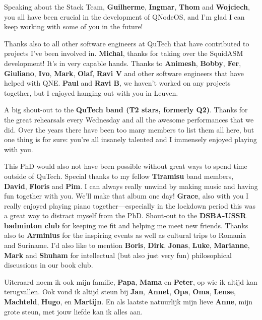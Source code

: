 Speaking about the Stack Team,
\textbf{Guilherme}, \textbf{Ingmar}, \textbf{Thom} and \textbf{Wojciech}, you all have been crucial in the development of QNodeOS, and I'm glad I can keep working with some of you in the future!

Thanks also to all other software engineers at QuTech that have contributed to projects I've been involved in.
\textbf{Michal}, thanks for taking over the SquidASM development! It's in very capable hands.
Thanks to \textbf{Animesh}, \textbf{Bobby}, \textbf{Fer}, \textbf{Giuliano}, \textbf{Ivo}, \textbf{Mark}, \textbf{Olaf}, \textbf{Ravi V} and other software engineers that have helped with QNE.
\textbf{Paul} and \textbf{Ravi B}, we haven't worked on any projects together, but I enjoyed hanging out with you in Leuven.

A big shout-out to the \textbf{QuTech band (T2 stars, formerly Q2)}.
Thanks for the great rehearsals every Wednesday and all the awesome performances that we did.
Over the years there have been too many members to list them all here, but one thing is for sure: you're all insanely talented and I immensely enjoyed playing with you.

This PhD would also not have been possible without great ways to spend time outside of QuTech.
Special thanks to my fellow \textbf{Tiramisu} band members, \textbf{David}, \textbf{Floris} and \textbf{Pim}.
I can always really unwind by making music and having fun together with you.
We'll make that album one day!
\textbf{Grace}, also with you I really enjoyed playing piano together---especially in the lockdown period this was a great way to distract myself from the PhD.
Shout-out to the \textbf{DSBA-USSR badminton club} for keeping me fit and helping me meet new friends.
Thanks also to \textbf{Arminius} for the inspiring events as well as cultural trips to Romania and Suriname.
I'd also like to mention \textbf{Boris}, \textbf{Dirk}, \textbf{Jonas}, \textbf{Luke}, \textbf{Marianne}, \textbf{Mark} and \textbf{Shuham} for intellectual (but also just very fun) philosophical discussions in our book club.

Uiteraard noem ik ook mijn familie, \textbf{Papa}, \textbf{Mama} en \textbf{Peter}, op wie ik altijd kan terugvallen.
Ook vond ik altijd steun bij \textbf{Jan}, \textbf{Annet}, \textbf{Opa}, \textbf{Oma}, \textbf{Lense}, \textbf{Machteld}, \textbf{Hugo}, en \textbf{Martijn}.
En als laatste natuurlijk mijn lieve \textbf{Anne}, mijn grote steun, met jouw liefde kan ik alles aan.







